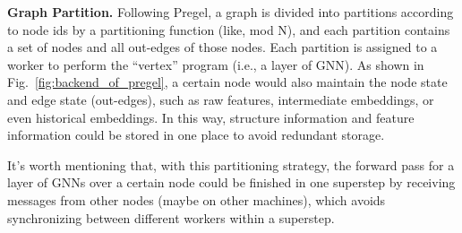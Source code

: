 \documentclass[conference]{IEEEtran}
\begin{document}
\textbf{Graph Partition.} Following Pregel\cite{b22}, a graph is divided into partitions according to node ids by a partitioning function (like, mod N), and each partition contains a set of nodes and all out-edges of those nodes.
Each partition is assigned to a worker to perform the ``vertex'' program (i.e., a layer of GNN).
As shown in Fig.~\ref{fig:backend_of_pregel}, a certain node would also maintain the node state and edge state (out-edges), such as raw features, intermediate embeddings, or even historical embeddings.
In this way, structure information and feature information could be stored in one place to avoid redundant storage.

It's worth mentioning that, with this partitioning strategy, the forward pass for a layer of GNNs over a certain node could be finished in one superstep by receiving messages from other nodes (maybe on other machines), which avoids synchronizing between different workers within a superstep.


%



\end{document}
